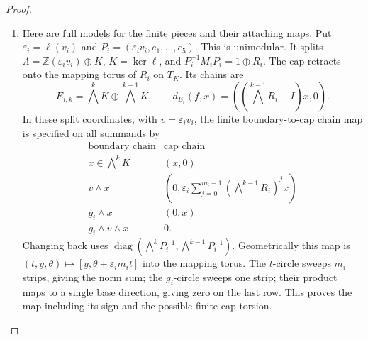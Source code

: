 \documentclass[11pt,a4paper]{article}
\theoremstyle{definition}
\begin{document}
\begin{proof}
\begin{enumerate}[label=\arabic*.]
\item Here are full models for the finite pieces and their attaching maps.
Put $\varepsilon_i=\ell(v_i)$ and
$P_i=(\varepsilon_iv_i,e_1,\ldots,e_5)$.
This is unimodular.  It splits
$\Lambda=\mathbb Z(\varepsilon_iv_i)\oplus K$, $K=\ker\ell$,
and $P_i^{-1}M_iP_i=1\oplus R_i$.
The cap retracts onto the mapping torus of $R_i$ on $T_K$.
Its chains are
\[
E_{i,k}=\bigwedge^kK\oplus\bigwedge^{k-1}K,
\qquad d_{E_i}(f,x)=((\bigwedge^{k-1}R_i-I)x,0).
\tag{1.12.4}
\]
In these split coordinates, with $v=\varepsilon_iv_i$, the finite
boundary-to-cap chain map is specified on all summands by
\[
\begin{array}{c|c}
\text{boundary chain}&\text{cap chain}\\\hline
x\in\bigwedge^kK&(x,0)\\
v\wedge x&(0,\varepsilon_i\sum_{j=0}^{m_i-1}
                  (\bigwedge^{k-1}R_i)^jx)\\
g_i\wedge x&(0,x)\\
g_i\wedge v\wedge x&0.
\end{array}
\tag{1.12.5}
\]
Changing back uses
$\operatorname{diag}(\bigwedge^kP_i^{-1},
\bigwedge^{k-1}P_i^{-1})$.
Geometrically this map is
$(t,y,\theta)\mapsto[y,\theta+\varepsilon_im_it]$ into the mapping
torus.  The $t$-circle sweeps $m_i$ strips, giving the norm sum; the
$g_i$-circle sweeps one strip; their product maps to a single
base direction, giving zero on the last row.  This proves the map
including its sign and the possible finite-cap torsion.


\end{enumerate}
\end{proof}
\end{document}
